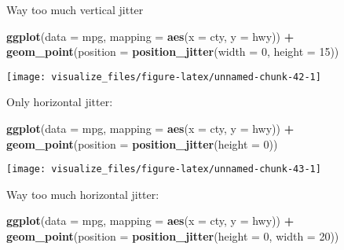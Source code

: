 \documentclass[]{book}
\newenvironment{Shaded}{\begin{snugshade}}{\end{snugshade}}
\newcommand{\DataTypeTok}[1]{\textcolor[rgb]{0.13,0.29,0.53}{#1}}
\newcommand{\DecValTok}[1]{\textcolor[rgb]{0.00,0.00,0.81}{#1}}
\newcommand{\KeywordTok}[1]{\textcolor[rgb]{0.13,0.29,0.53}{\textbf{#1}}}
\newcommand{\NormalTok}[1]{#1}
\newcommand{\OperatorTok}[1]{\textcolor[rgb]{0.81,0.36,0.00}{\textbf{#1}}}
\newcommand{\StringTok}[1]{\textcolor[rgb]{0.31,0.60,0.02}{#1}}
\theoremstyle{definition}
\theoremstyle{definition}
\theoremstyle{definition}
\theoremstyle{remark}
\begin{document}
Way too much vertical jitter

\begin{Shaded}
\begin{Highlighting}[]
\KeywordTok{ggplot}\NormalTok{(}\DataTypeTok{data =}\NormalTok{ mpg, }\DataTypeTok{mapping =} \KeywordTok{aes}\NormalTok{(}\DataTypeTok{x =}\NormalTok{ cty, }\DataTypeTok{y =}\NormalTok{ hwy)) }\OperatorTok{+}\StringTok{ }
\StringTok{  }\KeywordTok{geom_point}\NormalTok{(}\DataTypeTok{position =} \KeywordTok{position_jitter}\NormalTok{(}\DataTypeTok{width =} \DecValTok{0}\NormalTok{, }\DataTypeTok{height =} \DecValTok{15}\NormalTok{))}
\end{Highlighting}
\end{Shaded}

\begin{center}\texttt{[image: visualize\_files/figure-latex/unnamed-chunk-42-1]} \end{center}

Only horizontal jitter:

\begin{Shaded}
\begin{Highlighting}[]
\KeywordTok{ggplot}\NormalTok{(}\DataTypeTok{data =}\NormalTok{ mpg, }\DataTypeTok{mapping =} \KeywordTok{aes}\NormalTok{(}\DataTypeTok{x =}\NormalTok{ cty, }\DataTypeTok{y =}\NormalTok{ hwy)) }\OperatorTok{+}\StringTok{ }
\StringTok{  }\KeywordTok{geom_point}\NormalTok{(}\DataTypeTok{position =} \KeywordTok{position_jitter}\NormalTok{(}\DataTypeTok{height =} \DecValTok{0}\NormalTok{))}
\end{Highlighting}
\end{Shaded}

\begin{center}\texttt{[image: visualize\_files/figure-latex/unnamed-chunk-43-1]} \end{center}

Way too much horizontal jitter:

\begin{Shaded}
\begin{Highlighting}[]
\KeywordTok{ggplot}\NormalTok{(}\DataTypeTok{data =}\NormalTok{ mpg, }\DataTypeTok{mapping =} \KeywordTok{aes}\NormalTok{(}\DataTypeTok{x =}\NormalTok{ cty, }\DataTypeTok{y =}\NormalTok{ hwy)) }\OperatorTok{+}\StringTok{ }
\StringTok{  }\KeywordTok{geom_point}\NormalTok{(}\DataTypeTok{position =} \KeywordTok{position_jitter}\NormalTok{(}\DataTypeTok{height =} \DecValTok{0}\NormalTok{, }\DataTypeTok{width =} \DecValTok{20}\NormalTok{))}
\end{Highlighting}
\end{Shaded}
\end{document}

